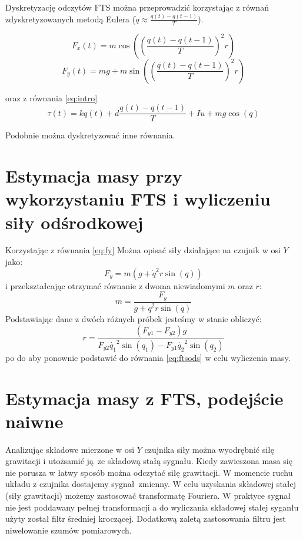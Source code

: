 \documentclass[a4paper, 10pt]{article}
\begin{document}
Dyskretyzację odczytów FTS można przeprowadzić korzystając z równań zdyskretyzowanych metodą Eulera ($\dot{q} \approx \frac{q(t)-q(t-1)}{T}$). 

\begin{equation}
F_x(t) = m\cos{((\frac{q(t)-q(t-1)}{T})^2 r)}
\end{equation}
\begin{equation}
\label{eq:fy}
F_y(t) = mg + m\sin{((\frac{q(t)-q(t-1)}{T})^2 r)}
\end{equation}

oraz z równania \ref{eq:intro}
\begin{equation}
\tau(t) = kq(t) + d\frac{q(t)-q(t-1)}{T} + Iu + mg\cos(q)
\end{equation}

Podobnie można dyskretyzować inne równania.
\section{Estymacja masy przy wykorzystaniu FTS i wyliczeniu siły odśrodkowej}
\label{sec:ftsods}
Korzystając z równania \ref{eq:fy} Można opisać siły działające na czujnik w osi $Y$ jako:
\begin{equation}
F_y  = m(g + \dot{q}^2r\sin{(q)})
\end{equation}
i przekształcając otrzymać równanie z dwoma niewiadomymi $m$ oraz $r$:
\begin{equation}
\label{eq:ftsods}
m = \frac{F_y}{g+\dot{q}^2r\sin{(q)}}
\end{equation}
Podstawiając dane z dwóch różnych próbek jesteśmy w stanie obliczyć:
\begin{equation}
r = \frac{(F_{y1}-F_{y2})g}{F_{y2}\dot{q_1}^2\sin{(q_1)}-F_{y1}\dot{q_2}^2\sin{(q_2)}}
\end{equation}
po do aby ponownie podstawić do równania \ref{eq:ftsods} w celu wyliczenia masy.


\section{Estymacja masy z FTS, podejście naiwne}
\label{fts:nai}
Analizując składowe mierzone w osi $Y$ czujnika siły można wyodrębnić siłę grawitacji i utożsamić ją ze składową stałą sygnału. Kiedy zawieszona masa się nie porusza w łatwy sposób można odczytać siłę grawitacji. W momencie ruchu układu z czujnika dostajemy sygnał zmienny. W celu uzyskania składowej stałej (siły grawitacji) możemy zastosować transformatę Fouriera. W praktyce sygnał nie jest poddawany pełnej transformacji a do wyliczania składowej stałej syganłu użyty został filtr średniej kroczącej. Dodatkową zaletą zastosowania filtru jest niwelowanie szumów pomiarowych.
\end{document}
